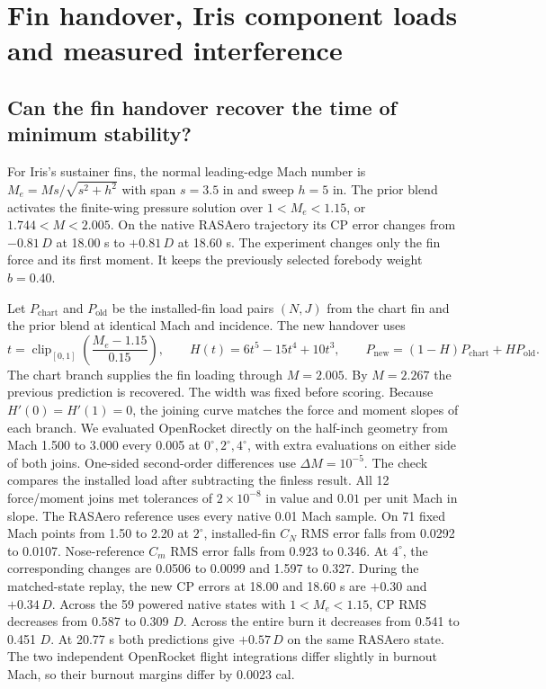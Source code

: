 \section{Fin handover, Iris component loads and measured interference}\label{sec:followup}
\subsection*{Can the fin handover recover the time of minimum stability?}
For Iris's sustainer fins, the normal leading-edge Mach number is $M_e=Ms/\sqrt{s^2+h^2}$ with span $s=3.5$ in and sweep $h=5$ in. The prior blend activates the finite-wing pressure solution over $1<M_e<1.15$, or $1.744<M<2.005$. On the native RASAero trajectory its CP error changes from $-0.81\,D$ at 18.00 s to $+0.81\,D$ at 18.60 s. The experiment changes only the fin force and its first moment. It keeps the previously selected forebody weight $b=0.40$.

Let $P_{\mathrm{chart}}$ and $P_{\mathrm{old}}$ be the installed-fin load pairs $(N,J)$ from the chart fin and the prior blend at identical Mach and incidence. The new handover uses
\[
 t=\operatorname{clip}_{[0,1]}\!\left(\frac{M_e-1.15}{0.15}\right),\qquad
 H(t)=6t^5-15t^4+10t^3,\qquad
 P_{\mathrm{new}}=(1-H)P_{\mathrm{chart}}+HP_{\mathrm{old}} .
\]
The chart branch supplies the fin loading through $M=2.005$. By $M=2.267$ the previous prediction is recovered. The width was fixed before scoring. Because $H'(0)=H'(1)=0$, the joining curve matches the force and moment slopes of each branch. We evaluated OpenRocket directly on the half-inch geometry from Mach 1.500 to 3.000 every 0.005 at $0^\circ,2^\circ,4^\circ$, with extra evaluations on either side of both joins. One-sided second-order differences use $\Delta M=10^{-5}$. The check compares the installed load after subtracting the finless result. All 12 force/moment joins met tolerances of $2\times10^{-8}$ in value and $0.01$ per unit Mach in slope. The RASAero reference uses every native 0.01 Mach sample.
On 71 fixed Mach points from 1.50 to 2.20 at $2^\circ$, installed-fin $C_N$ RMS error falls from 0.0292 to 0.0107. Nose-reference $C_m$ RMS error falls from 0.923 to 0.346. At $4^\circ$, the corresponding changes are 0.0506 to 0.0099 and 1.597 to 0.327. During the matched-state replay, the new CP errors at 18.00 and 18.60 s are $+0.30$ and $+0.34\,D$. Across the 59 powered native states with $1<M_e<1.15$, CP RMS decreases from 0.587 to 0.309 $D$. Across the entire burn it decreases from 0.541 to 0.451 $D$. At 20.77 s both predictions give $+0.57\,D$ on the same RASAero state. The two independent OpenRocket flight integrations differ slightly in burnout Mach, so their burnout margins differ by 0.0023 cal.
\clearpage
